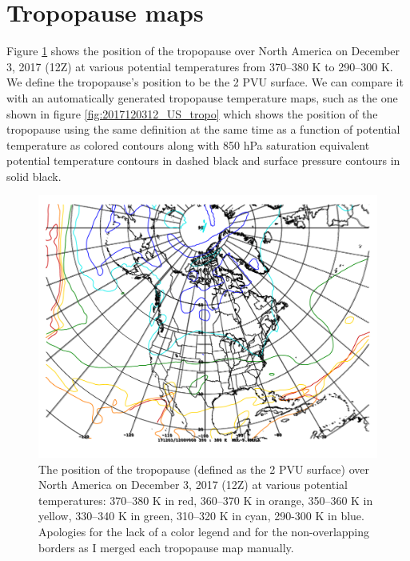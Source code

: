 \documentclass[11pt]{article}
\begin{document}
\section{Tropopause maps}
Figure \ref{fig:tropopause_map} shows the position of the tropopause over North America on December 3, 2017 (12Z) at various potential temperatures from 370--380 K to 290--300 K. We define the tropopause's position to be the 2 PVU surface. We can compare it with an automatically generated tropopause temperature maps, such as the one shown in figure \ref{fig:2017120312_US_tropo} which shows the position of the tropopause using the same definition at the same time as a function of potential temperature as colored contours along with 850 hPa saturation equivalent potential temperature contours in dashed black and surface pressure contours in solid black.

\begin{figure}[h!]
	\centering
	\includegraphics[width=\textwidth]{tropopause_map} %
	\caption{The position of the tropopause (defined as the 2 PVU surface) over North America on December 3, 2017 (12Z) at various potential temperatures: 370--380 K in red, 360--370 K in orange, 350--360 K in yellow, 330--340 K in green, 310--320 K in cyan, 290-300 K in blue. Apologies for the lack of a color legend and for the non-overlapping borders as I merged each tropopause map manually.}
	\label{fig:tropopause_map}
\end{figure}
\end{document}
